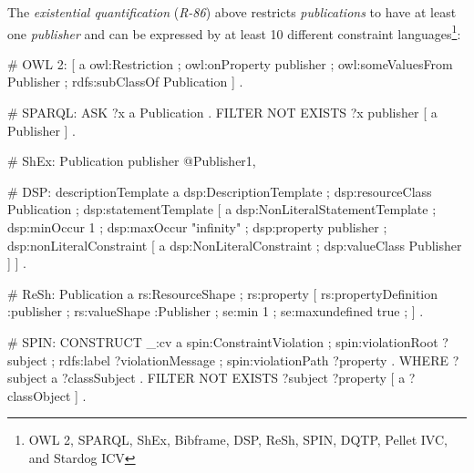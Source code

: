 \documentclass[a4paper,fontsize=11pt]{scrartcl}
\newcommand{\ms}[1]{\texttt{#1}}
\newenvironment{DL}{
  \vspace{0cm}
	\begin{center}
  \begin{tabular}{r l}

}{
  \end{tabular}
	\end{center}
}
\begin{document}
The {\em existential quantification} (\emph{R-86})
above restricts \emph{publications} to have at least one \emph{publisher} and can be expressed by at least 10 different constraint languages\footnote{OWL 2, SPARQL, ShEx, Bibframe, DSP, ReSh, SPIN, DQTP, Pellet IVC, and Stardog ICV}:

\begin{ex}
# OWL 2:
[ a owl:Restriction ;
  owl:onProperty publisher ;
  owl:someValuesFrom Publisher ;
  rdfs:subClassOf Publication ] .
	
# SPARQL:
ASK { ?x a Publication . FILTER NOT EXISTS { ?x publisher [ a Publisher ] } . }
	
# ShEx:
Publication {
    publisher @Publisher{1,} }
		
# DSP:
descriptionTemplate a dsp:DescriptionTemplate ;
    dsp:resourceClass Publication ; 
    dsp:statementTemplate [ a dsp:NonLiteralStatementTemplate ;
        dsp:minOccur 1 ; dsp:maxOccur "infinity" ; 
        dsp:property publisher ; 
        dsp:nonLiteralConstraint [ a dsp:NonLiteralConstraint ;
            dsp:valueClass Publisher ] ] .
		
# ReSh:
Publication a rs:ResourceShape ; rs:property [
    rs:propertyDefinition :publisher ;
    rs:valueShape :Publisher ;
    se:min 1 ; se:maxundefined true ; ] .
		
# SPIN:
CONSTRUCT {
    _:cv a spin:ConstraintViolation ; spin:violationRoot ?subject ;
         rdfs:label ?violationMessage ; spin:violationPath ?property . } WHERE 
{ ?subject a ?classSubject . FILTER NOT EXISTS { ?subject ?property [ a ?classObject ] } . }
\end{ex}


\end{document}
